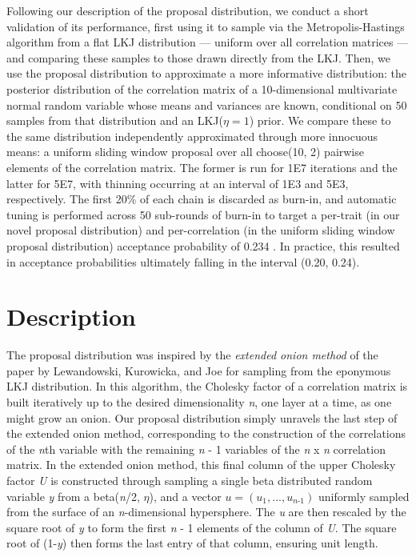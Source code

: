 Following our description of the proposal distribution, we conduct a short validation of its performance, first using it to sample via the Metropolis-Hastings algorithm from a flat LKJ distribution --- uniform over all correlation matrices --- and comparing these samples to those drawn directly from the LKJ. Then, we use the proposal distribution to approximate a more informative distribution: the posterior distribution of the correlation matrix of a 10-dimensional multivariate normal random variable whose means and variances are known, conditional on 50 samples from that distribution and an LKJ($\eta = 1$) prior. We compare these to the same distribution independently approximated through more innocuous means: a uniform sliding window proposal over all choose(10, 2) pairwise elements of the correlation matrix. The former is run for 1E7 iterations and the latter for 5E7, with thinning occurring at an interval of 1E3 and 5E3, respectively. The first 20\% of each chain is discarded as burn-in, and automatic tuning is performed across 50 sub-rounds of burn-in to target a per-trait (in our novel proposal distribution) and per-correlation (in the uniform sliding window proposal distribution) acceptance probability of 0.234 \citep{robertsWeakConvergenceOptimal1997}. In practice, this resulted in acceptance probabilities ultimately falling in the interval (0.20, 0.24).

\clearpage

\section{Description}

The proposal distribution was inspired by the \textit{extended onion method} of the \citeyear{lewandowskiGeneratingRandomCorrelation2009} paper by Lewandowski, Kurowicka, and Joe for sampling from the eponymous LKJ distribution. In this algorithm, the Cholesky factor of a correlation matrix is built iteratively up to the desired dimensionality \textit{n}, one layer at a time, as one might grow an onion. Our proposal distribution simply unravels the last step of the extended onion method, corresponding to the construction of the correlations of the \textit{n}th variable with the remaining \textit{n} - 1 variables of the \textit{n} x \textit{n} correlation matrix. In the extended onion method, this final column of the upper Cholesky factor \textit{U} is constructed through sampling a single beta distributed random variable \textit{y} from a beta(\textit{n}/2, $\eta$), and a vector $u=(\textit{u}_{1},...,\textit{u}_{\textit{n-1}})$ uniformly sampled from the surface of an \textit{n}-dimensional hypersphere. The \textit{u} are then rescaled by the square root of \textit{y} to form the first \textit{n} - 1 elements of the column of \textit{U}. The square root of (1-\textit{y}) then forms the last entry of that column, ensuring unit length. 

